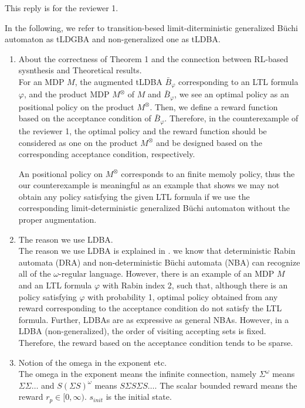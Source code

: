 \documentclass[10 pt, dvipdfmx]{article}
\theoremstyle{definition}
\begin{document}
This reply is for the reviewer 1.

In the following, we refer to transition-besed limit-diterministic generalized B\"{u}chi automaton as tLDGBA and non-generalized one as tLDBA.

\begin{enumerate}
  \item About the correctness of Theorem 1 and the connection between RL-based sysnthesis and Theoretical results. \\
  For an MDP $M$, the augmented tLDBA $\bar{B}_{\varphi}$ corresponding to an LTL formula $\varphi$, and the product MDP $M^{\otimes}$ of $M$ and $\bar{B}_{\varphi}$, we see an optimal policy as an positional policy on the product $M^{\otimes}$. Then, we define a reward function based on the acceptance condition of $\bar{B}_{\varphi}$. Therefore, in the counterexample of the reviewer 1, the optimal policy and the reward function should be considered as one on the product $M^{\otimes}$ and be designed based on the corresponding acceptance condition, respectively.

  An positional policy on $M^{\otimes}$ corresponds to an finite memoly policy, thus the our counterexample is meaningful as an example that shows we may not obtain any policy satisfying the given LTL formula if we use the corresponding limit-deterministic generalized B\"{u}chi automaton without the proper augmentation.

  \item The reason we use LDBA. \\
  The reason we use LDBA is explained in \cite{Hahn2019}. we know that deterministic Rabin automata (DRA) and non-deterministic B\"{u}chi automata (NBA) can recognize all of the $\omega$-regular language. However, there is an example of an MDP $M$ and an LTL formula $\varphi$ with Rabin index 2, such that, although there is an policy satisfying $\varphi$ with probability 1, optimal policy obtained from any reward corresponding to the acceptance condition do not satisfy the LTL formula. Further, LDBAs are as expressive as general NBAs.
  However, in a LDBA (non-generalized), the order of visiting accepting sets is fixed. Therefore, the reward based on the acceptance condition tends to be sparse.

  \item Notion of the omega in the exponent etc. \\
  The omega in the exponent means the infinite connection, namely $\Sigma^{\omega}$ means $\Sigma \Sigma \ldots$ and $S (\Sigma S)^{\omega}$ means $S \Sigma S \Sigma S \ldots$. The scalar bounded reward means the reward $r_p \in [0,\infty)$. $s_{init}$ is the initial state.


\end{enumerate}
\end{document}
